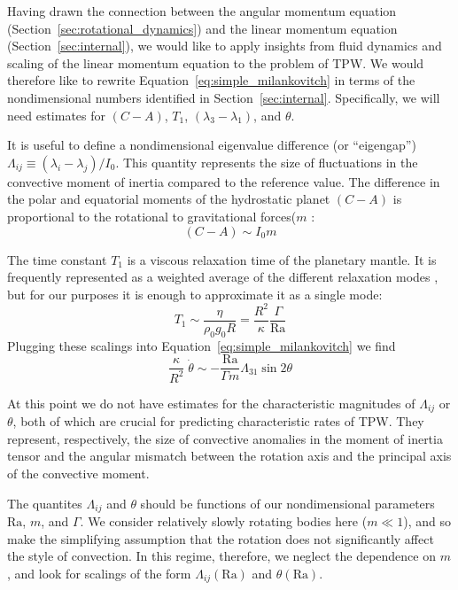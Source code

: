 \documentclass[extra,mreferee]{gji}
\begin{document}
Having drawn the connection between the angular momentum equation (Section~\ref{sec:rotational_dynamics}) and the linear momentum 
equation (Section~\ref{sec:internal}), we would like to apply insights from fluid dynamics and scaling of the 
linear momentum equation to the problem of TPW. We would therefore like to rewrite Equation~\eqref{eq:simple_milankovitch}
in terms of the nondimensional numbers identified in Section~\ref{sec:internal}.
Specifically, we will need estimates for $(C-A)$, $T_1$, $(\lambda_3-\lambda_1)$, and $\theta$. 

It is useful to define a nondimensional eigenvalue difference (or ``eigengap'') $\Lambda_{ij} \equiv (\lambda_i - \lambda_j)/I_0$.  
This quantity represents the size of fluctuations in the convective moment of inertia compared to the reference value.
The difference in the polar and equatorial moments of the hydrostatic planet $(C-A)$ is proportional to the rotational to gravitational forces($m$ \citep{munk1960rotation}:
\begin{equation}
(C-A) \sim I_0 m
\end{equation}

The time constant $T_1$ is a viscous relaxation time of the planetary mantle. It is frequently represented as a weighted average of the different relaxation modes \citep[e.g.][]{ricard1993polar, greff2004upwelling}, but for our purposes it is enough to approximate it as a single mode:
\begin{equation}
T_1 \sim \frac{ \eta }{ \rho_0 g_0 R} = \frac{R^2}{\kappa} \frac{\Gamma}{\mathrm{Ra} }
\end{equation}
Plugging these scalings into Equation~\eqref{eq:simple_milankovitch} we find
\begin{equation}
\frac{\kappa}{R^2} \; \dot{\theta} \sim - \frac{\mathrm{Ra}}{\Gamma m} \Lambda_{31} \sin{2 \theta}
\label{eq:scaled_rotation}
\end{equation}

At this point we do not have estimates for the characteristic magnitudes of $\Lambda_{ij}$ or $\theta$, both of which are crucial for predicting characteristic rates of TPW.
They represent, respectively, the size of convective anomalies in the moment of inertia tensor and the angular mismatch between the rotation axis and the principal axis of the convective moment.


The quantites $\Lambda_{ij}$ and $\theta$ should be functions of our nondimensional parameters $\mathrm{Ra}$, $m$, and $\Gamma$.  
We consider relatively slowly rotating bodies here ($m \ll 1$), and so make the simplifying assumption that the rotation does not significantly affect the style of convection.  
In this regime, therefore, we neglect the dependence on $m$, and look for scalings of the form $\Lambda_{ij}(\mathrm{Ra})$ and $\theta(\mathrm{Ra})$.
\end{document}
